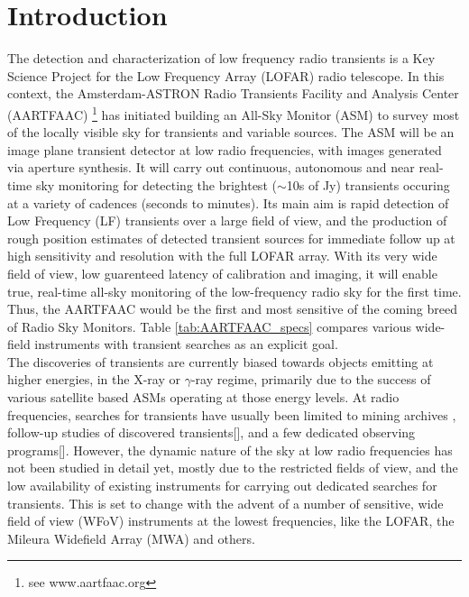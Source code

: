 \documentclass{aa}
\begin{document}

\maketitle

\section{\label{sec:Introduction}Introduction}
The detection  and characterization of low  frequency radio transients  is a Key
Science  Project \citep{fender2006lofar}  for  the Low  Frequency Array  (LOFAR)
\citep{vanhaarlem2013lofar}   radio    telescope.    In   this    context,   the
Amsterdam-ASTRON    Radio    Transients    Facility    and    Analysis    Center
(AARTFAAC) \footnote{see www.aartfaac.org }  has initiated building an All-Sky
Monitor  (ASM) to  survey most  of the  locally visible  sky for  transients and
variable sources.   The ASM  will be  an image plane  transient detector  at low
radio frequencies, with images generated  via aperture synthesis.  It will carry
out continuous, autonomous  and near real-time sky monitoring  for detecting the
brightest  ($\sim$10s  of Jy)  transients  occuring  at  a variety  of  cadences
(seconds to  minutes). Its  main aim  is rapid detection  of Low  Frequency (LF)
transients over  a large  field of  view, and the  production of  rough position
estimates  of  detected  transient  sources  for immediate  follow  up  at  high
sensitivity and resolution  with the full LOFAR array. With  its very wide field
of view, low guarenteed latency of calibration and imaging, it will enable true,
real-time  all-sky monitoring  of  the  low-frequency radio  sky  for the  first
time. Thus,  the AARTFAAC would  be the first  and most sensitive of  the coming
breed of  Radio Sky  Monitors.  Table \ref{tab:AARTFAAC_specs}  compares various
wide-field instruments with transient searches as an explicit goal.\\

The discoveries of  transients are currently biased towards  objects emitting at
higher  energies, in  the X-ray  or $\gamma$-ray  regime, primarily  due  to the
success of  various satellite  based ASMs operating  at those energy  levels. At
radio frequencies, searches  for transients have usually been  limited to mining
archives  \citep{bower2007submillijansky,bower2011search}, follow-up  studies of
discovered     transients{[}{]},    and     a     few    dedicated     observing
programs{[}{]}. However, the dynamic nature  of the sky at low radio frequencies
has not been studied in detail yet, mostly due to the restricted fields of view,
and  the low  availability of  existing instruments  for carrying  out dedicated
searches for transients.  This is set to  change with the advent of  a number of
sensitive, wide field of view (WFoV) instruments at the lowest frequencies, like
the LOFAR,  the Mileura Widefield Array  (MWA) \citep{lonsdale2009murchison} and
others.
\end{document}

